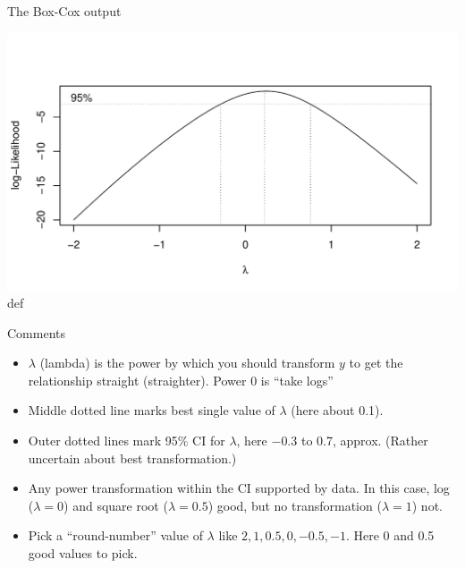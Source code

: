 \documentclass[ignorenonframetext,]{beamer}
\begin{document}
\begin{frame}{The Box-Cox output}
\protect\hypertarget{the-box-cox-output}{}

\includegraphics{figure/trento-1.pdf} def

\end{frame}

\begin{frame}{Comments}
\protect\hypertarget{comments-2}{}

\begin{itemize}
\item
  \(\lambda\) (lambda) is the power by which you should transform \(y\)
  to get the relationship straight (straighter). Power 0 is ``take
  logs''
\item
  Middle dotted line marks best single value of \(\lambda\) (here about
  0.1).
\item
  Outer dotted lines mark 95\% CI for \(\lambda\), here \(-0.3\) to 0.7,
  approx. (Rather uncertain about best transformation.)
\item
  Any power transformation within the CI supported by data. In this
  case, log (\(\lambda=0\)) and square root (\(\lambda=0.5\)) good, but
  no transformation (\(\lambda=1\)) not.
\item
  Pick a ``round-number'' value of \(\lambda\) like
  \(2,1,0.5,0,-0.5,-1\). Here 0 and 0.5 good values to pick.
\end{itemize}

\end{frame}
\end{document}
